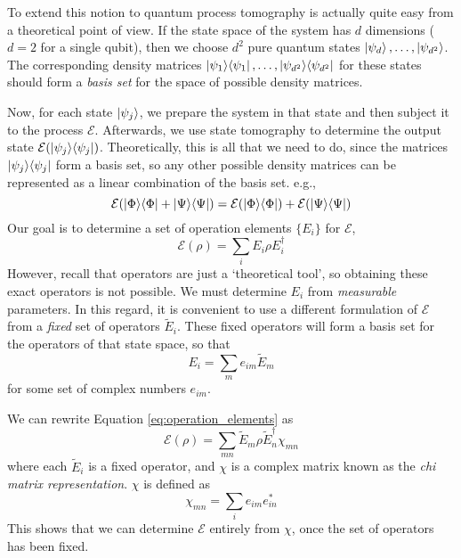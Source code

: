 To extend this notion to quantum process tomography is actually quite easy from a theoretical point
of view. If the state space of the system has $d$ dimensions ($d = 2$ for a single qubit), then we
choose $d^2$ pure quantum states $\ket{\psi_d}, \dots, \ket{\psi_{d^2}}$. The corresponding density
matrices $\ket{\psi_1}\!\bra{\psi_1}, \dots, \ket{\psi_{d^2}}\!\bra{\psi_{d^2}}$ for these states should
form a \textit{basis set} for the space of possible density matrices. 

Now, for each state $\ket{\psi_j}$, we prepare the system in that state and then subject it to the
process $\mathcal{E}$. Afterwards, we use state tomography to determine the output state
$\mathcal{E}(\ket{\psi_j}\!\bra{\psi_j})$. Theoretically, this is all that we need to do, since the
matrices $\ket{\psi_j}\!\bra{\psi_j}$ form a basis set, so any other possible density matrices can be
represented as a linear combination of the basis set. e.g.,
\begin{equation}
    \mathcal{E}(\ket{\Phi}\!\bra{\Phi} + \ket{\Psi}\!\bra{\Psi}) = 
    \mathcal{E}(\ket{\Phi}\!\bra{\Phi}) + \mathcal{E}(\ket{\Psi}\!\bra{\Psi})
\end{equation}
Our goal is to determine a set of operation elements $\{E_i\}$ for $\mathcal{E}$,
\begin{equation} \label{eq:operation_elements}
    \mathcal{E}(\rho) = \sum_i E_i \rho E_i^{\dagger} 
\end{equation}
However, recall that operators are just a `theoretical tool', so obtaining these exact operators is
not possible. We must determine $E_i$ from \textit{measurable} parameters. In this regard, it is
convenient to use a different formulation of $\mathcal{E}$ from a \textit{fixed} set of operators
$\tilde{E}_i$. These fixed operators will form a basis set for the operators of that state space, so
that
\begin{equation}
    E_i = \sum_m e_{im} \tilde{E}_m
\end{equation}
for some set of complex numbers $e_{im}$. 

We can rewrite Equation \ref{eq:operation_elements} as
\begin{equation}
    \mathcal{E}(\rho) = \sum_{mn} \tilde{E}_m \rho \tilde{E}_n^{\dagger} \chi_{mn}
\end{equation}
where each $\tilde{E}_i$ is a fixed operator, and $\chi$ is a complex matrix known as the
\textit{chi matrix representation}. $\chi$ is defined as
\begin{equation}
    \chi_{mn} = \sum_i e_{im} e_{in}^*
\end{equation}
This shows that we can determine $\mathcal{E}$ entirely from $\chi$, once the set of operators has
been fixed.